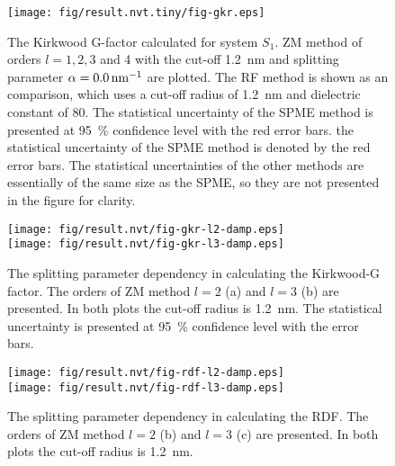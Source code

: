 \documentclass[aip,jcp,a4paper,reprint,unsortedaddress,onecolumn,fleqn]{revtex4}
\begin{document}
\begin{figure}[tbp]
\centering
\texttt{[image: fig/result.nvt.tiny/fig-gkr.eps]}
\caption{
  The Kirkwood G-factor calculated for system $S_{1}$.
  ZM method of orders $l=1,2,3$ and 4 with the cut-off 1.2~nm and
splitting parameter $\protect\alpha =0.0\,\text{nm}^{-1}$ are plotted. The
RF method is shown as an comparison, which uses a cut-off radius of 1.2~nm
and dielectric constant of 80. The statistical uncertainty of the SPME
method is presented at 95~\% confidence level with the red error bars. the
statistical uncertainty of the SPME method is denoted by the red error bars.
The statistical uncertainties of the other methods are essentially of the
same size as the SPME, so they are not presented in the figure for clarity.
}
\label{fig:gkr-conv-alpha}
\end{figure}

\begin{figure}[tbp]
\centering
\texttt{[image: fig/result.nvt/fig-gkr-l2-damp.eps]}\\
\texttt{[image: fig/result.nvt/fig-gkr-l3-damp.eps]}
\caption{  The 
  splitting parameter dependency in calculating the Kirkwood-G factor.
  The orders of ZM method $l=2$ (a)  and $l=3$ (b) are presented.
  In both plots the cut-off radius is 1.2~nm. The
  statistical uncertainty is presented at 95~\% confidence level with the
  error bars. }
\label{fig:gkr-conv-alpha}
\end{figure}


\begin{figure}[tbp]
\centering
\texttt{[image: fig/result.nvt/fig-rdf-l2-damp.eps]}\\
\texttt{[image: fig/result.nvt/fig-rdf-l3-damp.eps]}
\caption{  The 
  splitting parameter dependency in calculating the RDF.
  The orders of ZM method  $l=2$ (b)  and $l=3$ (c) are presented.
  In both plots the cut-off radius is 1.2~nm. }
\label{fig:gkr-conv-alpha}
\end{figure}


\newpage 

{}

\end{document}
